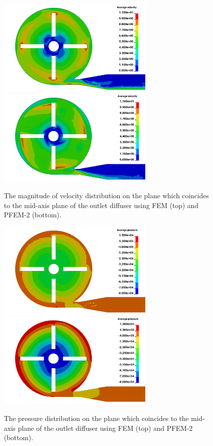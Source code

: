 \begin{figure}[htbp]
    \centering
    \includegraphics[width=3in]{imgs/nozzle_pump/pumpvel_fem.png}\\
    \vspace{.5cm}
    \includegraphics[width=3in]{imgs/nozzle_pump/pumpvel_pfem.png}
    \caption{The magnitude of velocity distribution on the plane which coincides to the mid-axis plane of the outlet diffuser using FEM (top) and PFEM-2 (bottom).}
    \label{fig:pumpvel}
\end{figure}

\begin{figure}[htbp]
    \centering
    \includegraphics[width=3in]{imgs/nozzle_pump/pumppres_fem.png}\\
    \vspace{.5cm}
    \includegraphics[width=3in]{imgs/nozzle_pump/pumppres_pfem.png}
    \caption{The pressure distribution on the plane which coincides to the mid-axis plane of the outlet diffuser using FEM (top) and PFEM-2 (bottom).}
    \label{fig:pumppres}
\end{figure}

